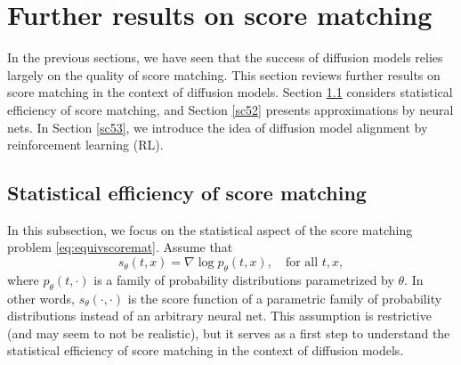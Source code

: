 \documentclass[letterpaper,11pt,reqno]{amsart}
\numberwithin{equation}{section}
\begin{document}
\section{Further results on score matching}
\label{sc5}

\quad In the previous sections,
we have seen that 
the success of diffusion models 
relies largely on the quality of score matching.
This section reviews further results 
on  score matching
in the context of diffusion models.
Section \ref{sc51}
considers
statistical efficiency of score matching,
and 
Section \ref{sc52} 
presents approximations by neural nets.
In Section \ref{sc53},
we introduce 
the idea of diffusion model alignment 
by reinforcement learning (RL).


\subsection{Statistical efficiency of score matching}
\label{sc51}

In this subsection,
we focus on the statistical aspect 
of the score matching problem \eqref{eq:equivscoremat}.
Assume that
\begin{equation}
\label{eq:assumpsm}
s_\theta(t,x) = \nabla \log p_\theta(t,x), \quad \mbox{for all } t,x,
\end{equation}
where $p_\theta(t,\cdot)$ is a family of probability distributions parametrized by $\theta$.
In other words,
$s_\theta(\cdot, \cdot)$ is the score function of a parametric family of probability distributions 
instead of an arbitrary neural net.
This assumption is restrictive (and may seem to not be realistic),
but it serves as a first step to understand the statistical efficiency of score matching in the context of diffusion models.
\end{document}
